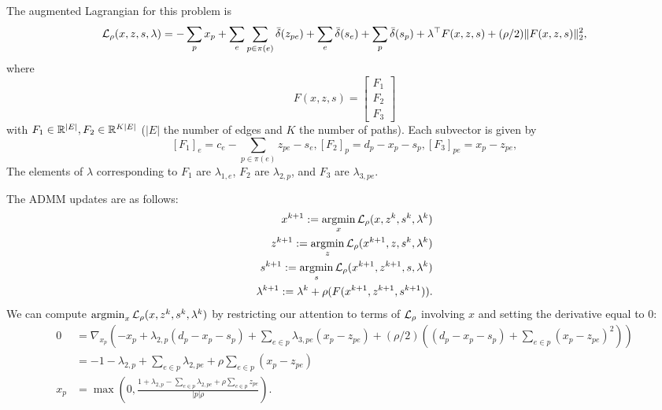 \documentclass[11pt]{article}
\begin{document}
The augmented Lagrangian for this problem is
\begin{equation}
    \label{eqn:network-lagrangian}
    \mathcal{L}_\rho(x,z,s,\lambda) =-\sum_p x_p + \sum_e\sum_{p\in\pi(e)} \bar\delta(z_{pe})
        + \sum_{e} \bar\delta(s_{e})
        + \sum_{p} \bar\delta(s_{p})
        + \lambda^\top F(x,z,s)
        + (\rho/2)\| F(x,z,s) \|_2^2,
\end{equation}
where
$$F(x,z,s) =
\begin{bmatrix}
F_1 \\
F_2 \\
F_3
\end{bmatrix}
$$
with $F_1 \in \mathbb{R}^{|E|}, F_2\in\mathbb{R}^{K|E|}$
($|E|$ the number of edges and $K$ the number of paths).
Each subvector is given by
$$
    [F_1]_e = c_e - \sum_{p\in\pi(e)}z_{pe} - s_{e},
    [F_2]_{p} = d_p - x_p - s_p,
    [F_3]_{pe} = x_p - z_{pe},
$$
The elements of $\lambda$ corresponding to $F_1$ are $\lambda_{1,e}$,
$F_2$ are $\lambda_{2,p}$, and $F_3$ are $\lambda_{3,pe}$.

The ADMM updates are as follows:
\begin{equation}
    \begin{aligned}
        x^{k+1} := \operatorname*{argmin}_{x} \mathcal{L}_\rho(x,z^k,s^{k},\lambda^k)\\
        z^{k+1} := \operatorname*{argmin}_{z} \mathcal{L}_\rho(x^{k+1},z,s^{k},\lambda^k)\\
        s^{k+1} := \operatorname*{argmin}_{s} \mathcal{L}_\rho(x^{k+1},z^{k+1},s,\lambda^k)\\
        \lambda^{k+1} := \lambda^k + \rho(F(x^{k+1},z^{k+1},s^{k+1})).
    \end{aligned}
\end{equation}
We can compute $\operatorname*{argmin}_{x} \mathcal{L}_\rho(x,z^k,s^k,\lambda^k)$ by restricting our
attention to terms of $\mathcal{L}_\rho$ involving $x$ and setting the derivative equal to 0:
\begin{align*}
0
&= \nabla_{x_p}(-x_p + \lambda_{2,p}(d_p - x_p - s_p) + \sum_{e\in p}\lambda_{3,pe}(x_p - z_{pe})
+ (\rho/2)((d_p - x_p - s_p) + \sum_{e \in p}(x_p - z_{pe})^2))\\
&= -1 -\lambda_{2,p} + \sum_{e \in p}\lambda_{2,pe} + \rho\sum_{e \in p} (x_p - z_{pe})\\
x_p &= \max(0,\frac{1 + \lambda_{2,p} - \sum_{e \in p}\lambda_{2,pe} + \rho \sum_{e\in p} z_{pe}}
{|p|\rho}).
\end{align*}
\end{document}
